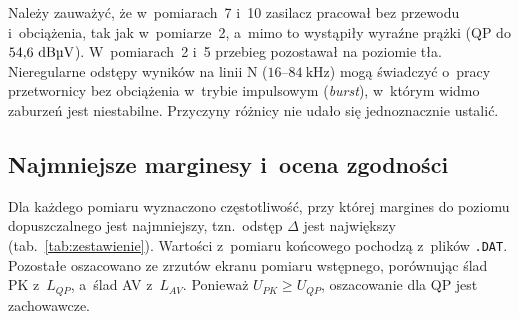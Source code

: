 \documentclass[11pt,a4paper]{article}
\newcommand{\dBuV}{\text{dB\textmu V}}
\begin{document}
Należy zauważyć, że w~pomiarach~7 i~10 zasilacz pracował bez przewodu i~obciążenia, tak jak
w~pomiarze~2, a~mimo to wystąpiły wyraźne prążki (QP do $54{,}6\ \dBuV$). W~pomiarach~2 i~5
przebieg pozostawał na poziomie tła. Nieregularne odstępy wyników na linii N
($16$--$84\ \mathrm{kHz}$) mogą świadczyć o~pracy przetwornicy bez obciążenia w~trybie
impulsowym (\emph{burst}), w~którym widmo zaburzeń jest niestabilne. Przyczyny różnicy nie
udało się jednoznacznie ustalić.

\subsection{Najmniejsze marginesy i~ocena zgodności}
\label{sec:zestawienie}

Dla każdego pomiaru wyznaczono częstotliwość, przy której margines do poziomu dopuszczalnego
jest najmniejszy, tzn.\ odstęp $\Delta$ jest największy (tab.~\ref{tab:zestawienie}). Wartości
z~pomiaru końcowego pochodzą z~plików \texttt{.DAT}. Pozostałe oszacowano ze zrzutów ekranu
pomiaru wstępnego, porównując ślad PK z~$L_{QP}$, a~ślad AV z~$L_{AV}$. Ponieważ
$U_{PK} \ge U_{QP}$, oszacowanie dla QP jest zachowawcze.
\end{document}
